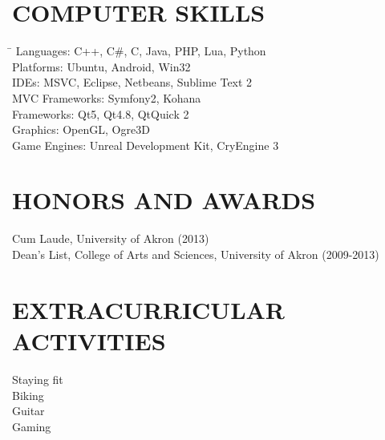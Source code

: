 \documentclass{res}
\begin{document}
\begin{resume}
\section{COMPUTER SKILLS}
  \vspace{-0.1in}
  \begin{tabbing}
  \hspace{2.3in} \= \kill
  Languages: \>  C++, C\#, C, Java, PHP, Lua, Python \\
  Platforms: \> Ubuntu, Android, Win32 \\
  IDEs: \> MSVC, Eclipse, Netbeans, Sublime Text 2 \\
  MVC Frameworks: \> Symfony2, Kohana \\
  Frameworks: \> Qt5, Qt4.8, QtQuick 2 \\
  Graphics: \> OpenGL, Ogre3D \\
  Game Engines: \> Unreal Development Kit, CryEngine 3
  \end{tabbing}

\section{HONORS AND AWARDS}          
    Cum Laude, University of Akron (2013) \\
    Dean's List, College of Arts and Sciences, University of Akron (2009-2013)         
 
\section{EXTRACURRICULAR ACTIVITIES}          
    Staying fit \\
    Biking \\
    Guitar \\
    Gaming  
 
\end{resume}
\end{document}
